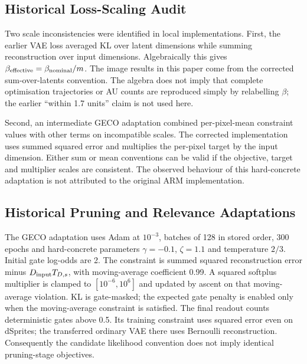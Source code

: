 \documentclass[make,article,submit,pdftex,moreauthors]{Definitions/mdpi}
\begin{document}
\subsection{Historical Loss-Scaling Audit}\label{app:scaling}
Two scale inconsistencies were identified in local implementations.
First, the earlier VAE loss averaged KL over latent dimensions while
summing reconstruction over input dimensions. Algebraically this gives
$\beta_{\rm effective}=\beta_{\rm nominal}/m$. The image results in
this paper come from the corrected sum-over-latents convention. The
algebra does not imply that complete optimisation trajectories or AU
counts are reproduced simply by relabelling $\beta$; the earlier
``within 1.7 units'' claim is not used here.

Second, an intermediate GECO adaptation combined per-pixel-mean
constraint values with other terms on incompatible scales. The corrected
implementation uses summed squared error and multiplies the per-pixel
target by the input dimension. Either sum or mean conventions can be
valid if the objective, target and multiplier scales are consistent.
The observed behaviour of this hard-concrete adaptation is not attributed
to the original ARM implementation.

\subsection{Historical Pruning and Relevance Adaptations}\label{app:adaptations}
The GECO adaptation uses Adam at $10^{-3}$, batches of 128 in stored
order, 300 epochs and hard-concrete parameters $\gamma=-0.1$,
$\zeta=1.1$ and temperature $2/3$. Initial gate log-odds are 2. The
constraint is summed squared reconstruction error minus
$D_{\rm input}T_{D,s}$, with moving-average coefficient 0.99. A squared
softplus multiplier is clamped to $[10^{-6},10^6]$ and updated by ascent
on that moving-average violation. KL is gate-masked; the expected gate
penalty is enabled only when the moving-average constraint is satisfied.
The final readout counts deterministic gates above 0.5. Its training
constraint uses squared error even on dSprites; the transferred ordinary
VAE there uses Bernoulli reconstruction. Consequently the candidate
likelihood convention does not imply identical pruning-stage objectives.
\end{document}

